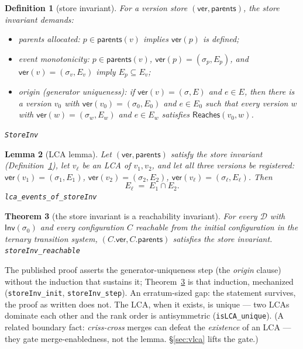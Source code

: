 \documentclass[11pt]{article}
\newtheorem{theorem}{Theorem}[section]
\newtheorem{lemma}[theorem]{Lemma}
\newtheorem{definition}[theorem]{Definition}
\newcommand{\Sinit}{\sigma_0}
\newcommand{\lean}[1]{\texttt{#1}}
\newcommand{\M}[1]{\mathcal{#1}}
\newcommand{\Inv}{\mathsf{Inv}}
\begin{document}
\begin{definition}[store invariant]
\label{def:storeinv}
For a version store $(\mathsf{ver}, \mathsf{parents})$, the
\emph{store invariant} demands:
\begin{itemize}[leftmargin=2em]
\item \emph{parents allocated}: $p \in \mathsf{parents}(v)$ implies
  $\mathsf{ver}(p)$ is defined;
\item \emph{event monotonicity}: $p \in \mathsf{parents}(v)$,
  $\mathsf{ver}(p) = (\sigma_p, E_p)$, and
  $\mathsf{ver}(v) = (\sigma_v, E_v)$ imply $E_p \subseteq E_v$;
\item \emph{origin} (generator uniqueness): if
  $\mathsf{ver}(v) = (\sigma, E)$ and $e \in E$, then there is a
  version $v_0$ with $\mathsf{ver}(v_0) = (\sigma_0, E_0)$ and
  $e \in E_0$ such that \emph{every} version $w$ with
  $\mathsf{ver}(w) = (\sigma_w, E_w)$ and $e \in E_w$ satisfies
  $\mathsf{Reaches}(v_0, w)$.
\end{itemize}
\hfill\lean{StoreInv}
\end{definition}

\begin{lemma}[LCA lemma]
\label{lem:lca}
Let $(\mathsf{ver}, \mathsf{parents})$ satisfy the store invariant
(Definition~\ref{def:storeinv}), let $v_\ell$ be an LCA of $v_1, v_2$,
and let all three versions be registered:
$\mathsf{ver}(v_1) = (\sigma_1, E_1)$,
$\mathsf{ver}(v_2) = (\sigma_2, E_2)$,
$\mathsf{ver}(v_\ell) = (\sigma_\ell, E_\ell)$. Then
\[
  E_\ell \;=\; E_1 \cap E_2 .
\]
\hfill\lean{lca\_events\_of\_storeInv}
\end{lemma}

\begin{theorem}[the store invariant is a reachability invariant]
\label{thm:storeinv}
For every $\M{D}$ with $\Inv(\Sinit)$ and every configuration $C$
reachable from the initial configuration in the ternary transition
system, $(C.\mathsf{ver}, C.\mathsf{parents})$ satisfies the store
invariant.
\hfill\lean{storeInv\_reachable}
\end{theorem}

The published proof asserts the generator-uniqueness step (the
\emph{origin} clause) without the induction that sustains it;
Theorem~\ref{thm:storeinv} is that induction, mechanized
(\lean{storeInv\_init}, \lean{storeInv\_step}). An erratum-sized gap:
the statement survives, the proof as written does not. The LCA, when it
exists, is unique --- two LCAs dominate each other and the rank order
is antisymmetric (\lean{isLCA\_unique}). (A related boundary fact:
\emph{criss-cross} merges can defeat the \emph{existence} of an
LCA --- they gate merge-enabledness, not the lemma. \S\ref{sec:vlca}
lifts the gate.)
\end{document}

